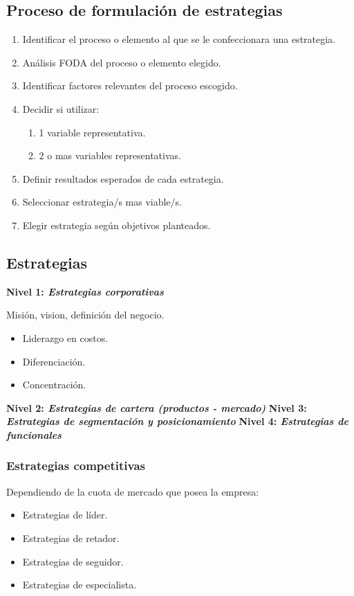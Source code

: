 \documentclass{templateNote}
\begin{document}
\subsection{Proceso de formulación de estrategias}
\begin{enumerate}
    \item Identificar el proceso o elemento al que se le confeccionara una estrategia.
    \item Análisis FODA del proceso o elemento elegido.
    \item Identificar factores relevantes del proceso escogido.
    \item Decidir si utilizar:
    \begin{enumerate}
        \item 1 variable representativa.
        \item 2 o mas variables representativas.
    \end{enumerate}
    \item Definir resultados esperados de cada estrategia.
    \item Seleccionar estrategia/s mas viable/s.
    \item Elegir estrategia según objetivos planteados.
\end{enumerate}

\subsection{Estrategias}
\hypertarget{estrategia_corporativa}{\noindent\textbf{Nivel 1: \textit{Estrategias corporativas}}}
\indent Misión, vision, definición del negocio.
\begin{itemize}
    \item Liderazgo en costos.
    \item Diferenciación.
    \item Concentración.
\end{itemize}
\textbf{Nivel 2: \textit{Estrategias de cartera (productos - mercado)}}
\textbf{Nivel 3: \textit{Estrategias de segmentación y posicionamiento}}
\textbf{Nivel 4: \textit{Estrategias de funcionales}}

\subsubsection{Estrategias competitivas}
\noindent Dependiendo de la cuota de mercado que posea la empresa:
\begin{itemize}
    \item Estrategias de líder.
    \item Estrategias de retador.
    \item Estrategias de seguidor.
    \item Estrategias de especialista.
\end{itemize}
\end{document}
